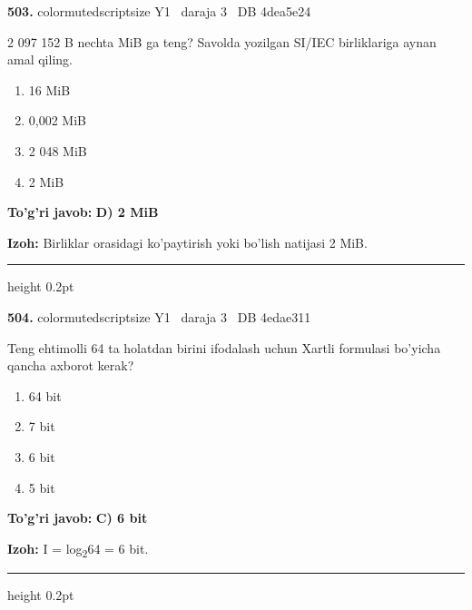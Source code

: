 \documentclass[10pt,a4paper,oneside]{article}
\begin{document}
\noindent\textbf{\color{ink}503.}  {color{muted}scriptsize Y1 \textbullet\ daraja 3 \textbullet\ DB 4dea5e24}
\par
2 097 152 B nechta MiB ga teng? Savolda yozilgan SI/IEC birliklariga aynan amal qiling.
\begin{enumerate}[label=\Alph*),leftmargin=9mm]
\item 16 MiB
\item 0,002 MiB
\item 2 048 MiB
\item 2 MiB
\end{enumerate}
\begin{tcolorbox}[enhanced,breakable,colback=teal!4,colframe=teal!50!black,boxrule=0.5pt,arc=1.1mm,left=3mm,right=3mm,top=1.7mm,bottom=1.7mm,before skip=2mm,after skip=2mm]
\textbf{\color{teal}To'g'ri javob:} \textbf{D) 2 MiB}
\par\smallskip
\textbf{Izoh:} Birliklar orasidagi ko'paytirish yoki bo'lish natijasi 2 MiB.
\end{tcolorbox}
\vspace{2mm}\hrule height 0.2pt \vspace{3mm}

\noindent\textbf{\color{ink}504.}  {color{muted}scriptsize Y1 \textbullet\ daraja 3 \textbullet\ DB 4edae311}
\par
Teng ehtimolli 64 ta holatdan birini ifodalash uchun Xartli formulasi bo'yicha qancha axborot kerak?
\begin{enumerate}[label=\Alph*),leftmargin=9mm]
\item 64 bit
\item 7 bit
\item 6 bit
\item 5 bit
\end{enumerate}
\begin{tcolorbox}[enhanced,breakable,colback=teal!4,colframe=teal!50!black,boxrule=0.5pt,arc=1.1mm,left=3mm,right=3mm,top=1.7mm,bottom=1.7mm,before skip=2mm,after skip=2mm]
\textbf{\color{teal}To'g'ri javob:} \textbf{C) 6 bit}
\par\smallskip
\textbf{Izoh:} I = log\textsubscript{2}64 = 6 bit.
\end{tcolorbox}
\vspace{2mm}\hrule height 0.2pt \vspace{3mm}
\end{document}
